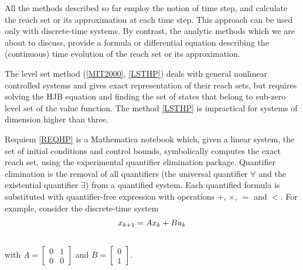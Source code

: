 \documentclass[letterpaper,10pt,english]{sphinxmanual}
\begin{document}
All the methods described so far employ the notion of time step, and
calculate the reach set or its approximation at each time step. This
approach can be used only with discrete-time systems. By contrast, the
analytic methods which we are about to discuss, provide a formula or
differential equation describing the (continuous) time evolution of the
reach set or its approximation.

The level set method ({\hyperref[chap_intro:mit2000]{{[}MIT2000{]}}}, {\hyperref[chap_intro:lsthp]{{[}LSTHP{]}}})
deals with general nonlinear controlled systems and gives
exact representation of their reach sets, but requires solving the HJB
equation and finding the set of states that belong to sub-zero level set
of the value function. The method {\hyperref[chap_intro:lsthp]{{[}LSTHP{]}}} is
impractical for systems of dimension higher than three.

Requiem {\hyperref[chap_intro:reqhp]{{[}REQHP{]}}} is a Mathematica notebook which, given a
linear system, the set of initial conditions and control bounds,
symbolically computes the exact reach set, using the experimental
quantifier elimination package. Quantifier elimination is the removal of
all quantifiers (the universal quantifier $\forall$ and the
existential quantifier $\exists$) from a quantified system. Each
quantified formula is substituted with quantifier-free expression with
operations $+$, $\times$, $=$ and $<$. For
example, consider the discrete-time system
\begin{gather}
\begin{split}x_{k+1} = Ax_k + Bu_k\end{split}\notag\\\begin{split}\end{split}\notag
\end{gather}
with $A=\left[\begin{array}{cc}0 & 1\\0 & 0\end{array}\right]$
and $B=\left[\begin{array}{c}0\\1\end{array}\right]$.
\end{document}
